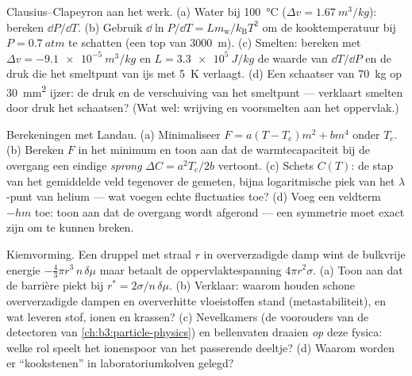 \begin{exercise}[$\star\star$]\label{exo:b3:phase-transitions:7}
Clausius--Clapeyron aan het werk. (a) Water bij \qty{100}{\celsius}
($\Delta v = \qty{1.67}{m^3/kg}$): bereken $\dd P/\dd T$. (b)
Gebruik $\dd\ln P/\dd T = Lm_{\text{w}}/k_{\text{B}}T^2$ om
de kooktemperatuur bij $P = \qty{0.7}{atm}$ te schatten (een top van
\qty{3000}{m}). (c) Smelten: bereken met $\Delta v = \qty{-9.1e-5}{m^3/kg}$ en
$L = \qty{3.3e5}{J/kg}$ de waarde van $\dd T/\dd P$ en de druk
die het smeltpunt van ijs met \qty{5}{K} verlaagt. (d) Een schaatser van
\qty{70}{kg} op \qty{30}{mm^2} ijzer: de druk en
de verschuiving van het smeltpunt --- verklaart smelten door druk
het schaatsen? (Wat wel: wrijving en voorsmelten aan het oppervlak.)
\end{exercise}

\begin{exercise}[$\star\star$]\label{exo:b3:phase-transitions:8}
Berekeningen met Landau. (a) Minimaliseer $F = a(T - T_{\text{c}})m^2 +
bm^4$ onder $T_{\text{c}}$. (b) Bereken $F$ in het minimum en
toon aan dat de warmtecapaciteit bij de overgang een eindige \emph{sprong}
$\Delta C =
a^2T_{\text{c}}/2b$ vertoont. (c) Schets $C(T)$:
de stap van het gemiddelde veld tegenover de gemeten, bijna logaritmische
piek van het $\lambda$-punt van helium --- wat voegen echte fluctuaties toe? (d)
Voeg een veldterm $-hm$ toe: toon aan dat de overgang wordt afgerond ---
een symmetrie moet exact zijn om te kunnen breken.
\end{exercise}

\begin{exercise}[$\star\star$]\label{exo:b3:phase-transitions:9}
Kiemvorming. Een druppel met straal $r$ in oververzadigde damp
wint de bulkvrije energie $-\tfrac43\pi r^3\,n\,\delta\mu$ maar betaalt
de oppervlaktespanning $4\pi r^2\sigma$. (a) Toon aan dat de barrière piekt bij
$r^* = 2\sigma/n\,\delta\mu$. (b) Verklaar: waarom houden schone
oververzadigde dampen en oververhitte vloeistoffen stand
(metastabiliteit), en wat leveren stof, ionen en krassen?
(c) Nevelkamers (de voorouders van de detectoren van
\cref{ch:b3:particle-physics}) en bellenvaten draaien \emph{op} deze
fysica: welke rol speelt het ionenspoor van het passerende deeltje? (d)
Waarom worden er ``kookstenen'' in laboratoriumkolven gelegd?
\end{exercise}

